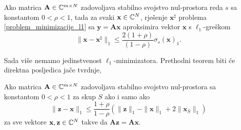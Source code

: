 \documentclass[a4paper,twoside,12pt]{memoir} %
\newcommand{\vect}[1]{\mathbf{#1}}
\renewcommand{\vec}{\vect}
\newcommand{\norm}[1]{\|{#1}\|}
\begin{document}
\begin{thm}\label{stabilnost_tm_1}
    Ako matrica $\vec A \in \C^{m \times N}$ zadovoljava stabilno svojstvo nul-prostora reda $s$ sa konstantom $0<\rho<1$, tada za svaki $\vec x \in \C^N$, rje\v{s}enje $\vec x^{\sharp}$ problema \eqref{problem_minimizacije_l1} sa $\vec y = \vec{Ax}$ aproksimira vektor $\vec x$ s $\ell_1$-gre\v{s}kom
    \begin{equation}\label{stabilnost_tm_1_nejed}
        \norm{\vec x - \vec x ^{\sharp}}_1 \leq \frac{2(1+\rho)}{(1-\rho)}\sigma_s(\vec x)_1.
    \end{equation}
\end{thm}
\noindent
Sada vi\v{s}e nemamo jedinstvenost $\ell_1$-minimizatora. Prethodni teorem biti \'ce direktna posljedica ja\v{c}e tvrdnje,
\begin{thm}\label{stabilnost_tm_2}
    Ako matrica $\vec A \in \C^{m \times N}$ zadovoljava stabilno svojstvo nul-prostora sa konstantom $0<\rho<1$ za skup $S$ ako i samo ako
    \begin{equation}\label{stabilnost_tm_2_nejed}
        \norm{\vec z - \vec x}_1  \leq \frac{1+\rho}{1-\rho}(\norm{\vec z}_1 - \norm{\vec x}_1 + 2 \norm{\vec x_{\bar S}}_1) 
    \end{equation}
    za sve vektore $\vec x, \vec z \in \C^N$ takve da $\vec{Az} = \vec{Ax}$.
\end{thm}
\end{document}
